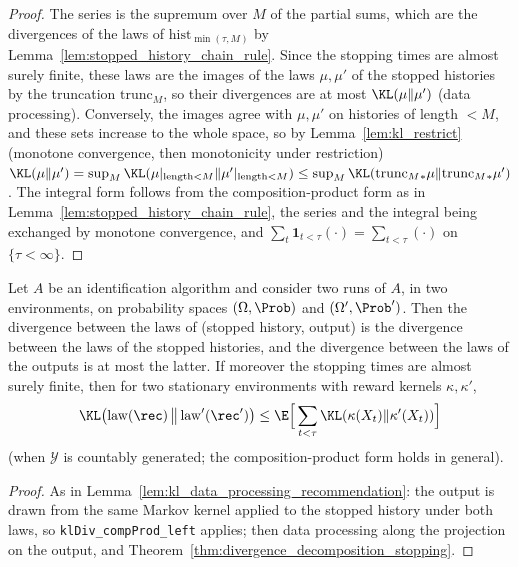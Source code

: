 \begin{proof}
\leanok
{}
The series is the supremum over $M$ of the partial sums, which are the divergences of the laws
of $\mathrm{hist}_{\min(\tau,M)}$ by Lemma~\ref{lem:stopped_history_chain_rule}. Since the
stopping times are almost surely finite, these laws are the images of the laws
$\mu,\mu'$ of the stopped histories by the truncation $\mathrm{trunc}_M$, so their divergences
are at most $\KL(\mu\|\mu')$ (data processing). Conversely, the images agree with $\mu,\mu'$ on
histories of length $< M$, and these sets increase to the whole space, so by
Lemma~\ref{lem:kl_restrict} (monotone convergence, then monotonicity under restriction)
$\KL(\mu\|\mu') = \sup_M\KL(\mu|_{\mathrm{length}<M}\|\mu'|_{\mathrm{length}<M}) \le \sup_M\KL(\mathrm{trunc}_M{}_*\mu\|\mathrm{trunc}_M{}_*\mu')$.
The integral form follows from the composition-product form as in
Lemma~\ref{lem:stopped_history_chain_rule}, the series and the integral being exchanged by
monotone convergence, and $\sum_t\mathbf 1_{t<\tau}(\cdot) = \sum_{t<\tau}(\cdot)$ on $\{\tau<\infty\}$.
\end{proof}

\begin{lemma}\label{lem:run_change_of_measure}
\leanok
{}
Let $A$ be an identification algorithm and consider two runs of $A$, in two environments, on
probability spaces $(\Omega,\Prob)$ and $(\Omega',\Prob')$. Then the divergence between the laws
of (stopped history, output) is the divergence between the laws of the stopped histories, and
the divergence between the laws of the outputs is at most the latter. If moreover the stopping
times are almost surely finite, then for two stationary environments with reward kernels
$\kappa,\kappa'$,
\[
  \KL\big(\mathrm{law}(\rec)\,\big\|\,\mathrm{law}'(\rec')\big)
  \le \E\Big[\sum_{t<\tau}\KL(\kappa(X_t)\|\kappa'(X_t))\Big]
\]
(when $\mathcal{Y}$ is countably generated; the composition-product form holds in general).
\end{lemma}

\begin{proof}
\leanok
{}
As in Lemma~\ref{lem:kl_data_processing_recommendation}: the output is drawn from the same
Markov kernel applied to the stopped history under both laws, so \texttt{klDiv\_compProd\_left}
applies; then data processing along the projection on the output, and
Theorem~\ref{thm:divergence_decomposition_stopping}.
\end{proof}

